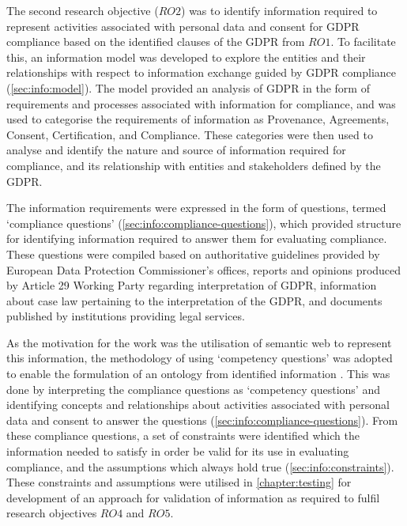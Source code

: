 The second research objective ($RO2$) was to identify information required to represent activities associated with personal data and consent for GDPR compliance based on the identified clauses of the GDPR from $RO1$.
To facilitate this, an information model was developed to explore the entities and their relationships with respect to information exchange guided by GDPR compliance (\autoref{sec:info:model}). The model provided an analysis of GDPR in the form of requirements and processes associated with information for compliance, and was used to categorise the requirements of information as Provenance, Agreements, Consent, Certification, and Compliance. These categories were then used to analyse and identify the nature and source of information required for compliance, and its relationship with entities and stakeholders defined by the GDPR.

The information requirements were expressed in the form of questions, termed `compliance questions' (\autoref{sec:info:compliance-questions}), which provided structure for identifying information required to answer them for evaluating compliance. 
These questions were compiled based on authoritative guidelines provided by European Data Protection Commissioner's offices, reports and opinions produced by Article 29 Working Party regarding interpretation of GDPR, information about case law pertaining to the interpretation of the GDPR, and documents published by institutions providing legal services.

As the motivation for the work was the utilisation of semantic web to represent this information, the methodology of using `competency questions' was adopted to enable the formulation of an ontology from identified information \cite{noy_ontology_2001}.
This was done by interpreting the compliance questions as `competency questions' and identifying concepts and relationships about activities associated with personal data and consent to answer the questions (\autoref{sec:info:compliance-questions}).
From these compliance questions, a set of constraints were identified which the information needed to satisfy in order be valid for its use in evaluating compliance, and the assumptions which always hold true (\autoref{sec:info:constraints}). These constraints and assumptions were utilised in \autoref{chapter:testing} for development of an approach for validation of information as required to fulfil research objectives $RO4$ and $RO5$.

